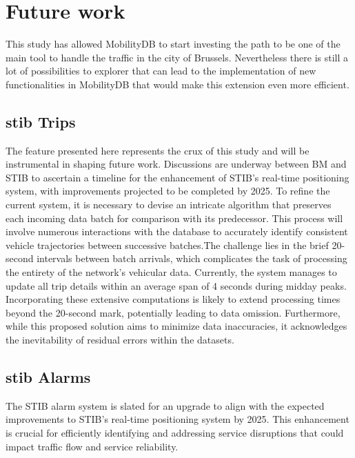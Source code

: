 \documentclass[12pt]{report}
\begin{document}
	\chapter{Future work}
	
	This study has allowed MobilityDB to start investing the path to be one of the main tool to handle the traffic in the city of Brussels. Nevertheless there is still a lot of possibilities to explorer that can lead to the implementation of new functionalities in MobilityDB that would make this extension even more efficient.
	
	\section{\acrshort{stib} Trips}
	
	The feature presented here represents the crux of this study and will be instrumental in shaping future work. Discussions are underway between BM and STIB to ascertain a timeline for the enhancement of STIB's real-time positioning system, with improvements projected to be completed by 2025. To refine the current system, it is necessary to devise an intricate algorithm that preserves each incoming data batch for comparison with its predecessor. This process will involve numerous interactions with the database to accurately identify consistent vehicle trajectories between successive batches.The challenge lies in the brief 20-second intervals between batch arrivals, which complicates the task of processing the entirety of the network's vehicular data. Currently, the system manages to update all trip details within an average span of 4 seconds during midday peaks. Incorporating these extensive computations is likely to extend processing times beyond the 20-second mark, potentially leading to data omission. Furthermore, while this proposed solution aims to minimize data inaccuracies, it acknowledges the inevitability of residual errors within the datasets.
	
	
	\section{\acrshort{stib} Alarms}
	
	The STIB alarm system is slated for an upgrade to align with the expected improvements to STIB's real-time positioning system by 2025. This enhancement is crucial for efficiently identifying and addressing service disruptions that could impact traffic flow and service reliability.
	
\end{document}
